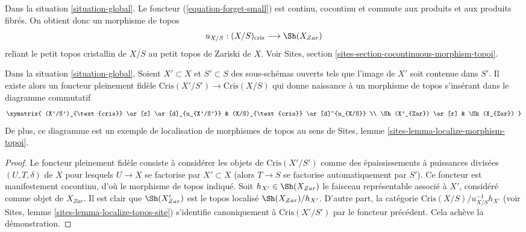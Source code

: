 \begin{remark}
\label{remark-compare-zariski}
Dans la situation \ref{situation-global}.
Le foncteur (\ref{equation-forget-small}) est continu, cocontinu et
commute aux produits et aux produits fibrés.
On obtient donc un morphisme de topos
$$
u_{X/S} : (X/S)_{\text{cris}} \longrightarrow \Sh(X_{Zar})
$$
reliant le petit topos cristallin de $X/S$ au
petit topos de Zariski de $X$.
Voir Sites, section \ref{sites-section-cocontinuous-morphism-topoi}.
\end{remark}

\begin{lemma}
\label{lemma-localize}
Dans la situation \ref{situation-global}.
Soient $X' \subset X$ et $S' \subset S$ des sous-schémas ouverts tels que
l'image de $X'$ soit contenue dans $S'$. Il existe alors un foncteur pleinement fidèle
$\text{Cris}(X'/S') \to \text{Cris}(X/S)$
qui donne naissance à un morphisme de topos s'insérant dans le diagramme
commutatif
$$
\xymatrix{
(X'/S')_{\text{cris}} \ar[r] \ar[d]_{u_{X'/S'}} &
(X/S)_{\text{cris}} \ar[d]^{u_{X/S}} \\
\Sh(X'_{Zar}) \ar[r] & \Sh(X_{Zar})
}
$$
De plus, ce diagramme est un exemple de localisation de morphismes de
topos au sens de Sites, lemme \ref{sites-lemma-localize-morphism-topoi}.
\end{lemma}

\begin{proof}
Le foncteur pleinement fidèle consiste à considérer les
objets de $\text{Cris}(X'/S')$ comme des épaississements à puissances
divisées $(U, T, \delta)$ de $X$ pour lesquels $U \to X$
se factorise par $X' \subset X$ (alors $T \to S$ se
factorise automatiquement par $S'$). Ce foncteur est manifestement cocontinu,
d'où le morphisme de topos indiqué.
Soit $h_{X'} \in \Sh(X_{Zar})$ le faisceau représentable associé
à $X'$, considéré comme objet de $X_{Zar}$. Il est clair que
$\Sh(X'_{Zar})$ est le topos localisé $\Sh(X_{Zar})/h_{X'}$.
D'autre part, la catégorie $\text{Cris}(X/S)/u_{X/S}^{-1}h_{X'}$
(voir Sites, lemme \ref{sites-lemma-localize-topos-site})
s'identifie canoniquement à $\text{Cris}(X'/S')$ par le foncteur précédent.
Cela achève la démonstration.
\end{proof}

